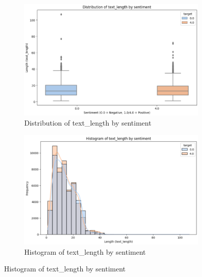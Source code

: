 \begin{figure}[H]
    \centering
    \begin{subfigure}[b]{0.48\textwidth}
        \includegraphics[width=\textwidth]{img/visualize_pic/text_length.png}
    \caption{Distribution of text\_length by sentiment}
    \end{subfigure}
    \begin{subfigure}[b]{0.48\textwidth}
         \includegraphics[width=\textwidth]{img/visualize_pic/histogram_text_length.png}
    \caption{Histogram of text\_length by sentiment}
    \end{subfigure}
\end{figure}


